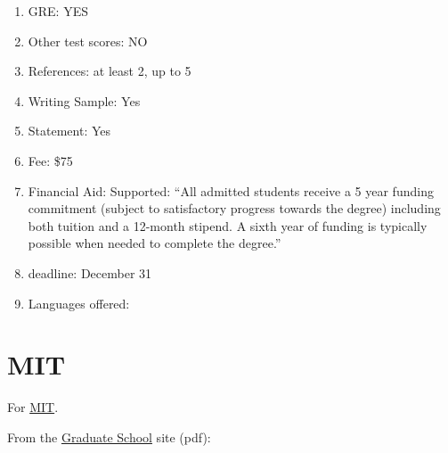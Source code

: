 \documentclass[11pt]{article}
\begin{document}
\begin{enumerate}
\item GRE: YES
\item Other test scores: NO
\item References: at least 2, up to 5
\item Writing Sample: Yes
\item Statement: Yes
\item Fee: \$75
\item Financial Aid: Supported: ``All admitted students receive a 5 year funding commitment (subject to satisfactory progress towards the degree) including both tuition and a 12-month stipend. A sixth year of funding is typically possible when needed to complete the degree.''
\item deadline: December 31
\item Languages offered: 
\end{enumerate}

\section{MIT}
For \href{http://web.mit.edu/linguistics/index.html}{MIT}.

From the \href{http://web.mit.edu/admissions/graduate/requirements/index.html}{Graduate School} site (pdf):\\
\end{document}
